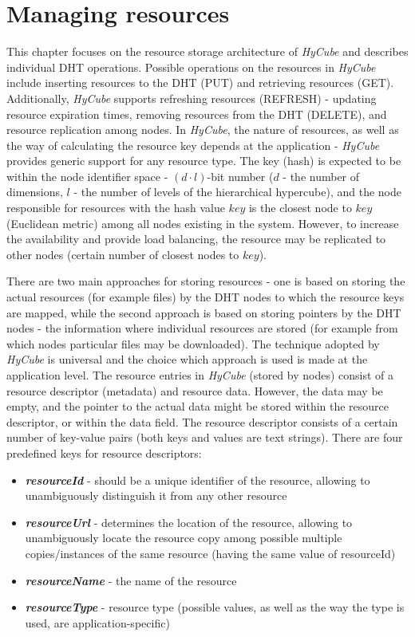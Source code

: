 
\chapter{Managing resources}
\label{sec:resourcesManagement}

This chapter focuses on the resource storage architecture of \emph{HyCube} and describes individual DHT operations. Possible operations on the resources in \emph{HyCube} include inserting resources to the DHT (PUT) and retrieving resources (GET). Additionally, \emph{HyCube} supports refreshing resources (REFRESH) - updating resource expiration times, removing resources from the DHT (DELETE), and resource replication among nodes. In \emph{HyCube}, the nature of resources, as well as the way of calculating the resource key depends at the application - \emph{HyCube} provides generic support for any resource type. The key (hash) is expected to be within the node identifier space - $(d \cdot l)$-bit number ($d$ - the number of dimensions, $l$ - the number of levels of the hierarchical hypercube), and the node responsible for resources with the hash value $key$ is the closest node to $key$ (Euclidean metric) among all nodes existing in the system. However, to increase the availability and provide load balancing, the resource may be replicated to other nodes (certain number of closest nodes to $key$).

There are two main approaches for storing resources - one is based on storing the actual resources (for example files) by the DHT nodes to which the resource keys are mapped, while the second approach is based on storing pointers by the DHT nodes - the information where individual resources are stored (for example from which nodes particular files may be downloaded). The technique adopted by \emph{HyCube} is universal and the choice which approach is used is made at the application level. The resource entries in \emph{HyCube} (stored by nodes) consist of a resource descriptor (metadata) and resource data. However, the data may be empty, and the pointer to the actual data might be stored within the resource descriptor, or within the data field. The resource descriptor consists of a certain number of key-value pairs (both keys and values are text strings). There are four predefined keys for resource descriptors:

\pagebreak

\begin{itemize}
	\renewcommand{\labelitemi}{$\bullet$}
	\item \emph{\textbf{resourceId}}	- should be a unique identifier of the resource, allowing to unambiguously distinguish it from any other resource
	\item \emph{\textbf{resourceUrl}}	- determines the location of the resource, allowing to unambiguously locate the resource copy among possible multiple copies/instances of the same resource (having the same value of resourceId)
	\item \emph{\textbf{resourceName}}	- the name of the resource
	\item \emph{\textbf{resourceType}}	- resource type (possible values, as well as the way the type is used, are application-specific)
\end{itemize}

